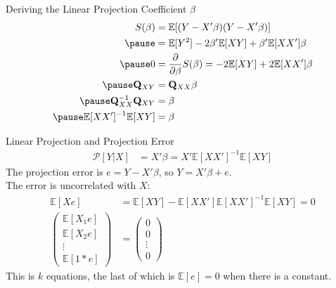 \documentclass[aspectratio=169, handout, t]{beamer}
\numberwithin{equation}{section}
\begin{document}
\begin{frame}{Deriving the Linear Projection Coefficient $\beta$}
\begin{align*}
S(\beta)&=\mathbb{E}[(Y-X'\beta)(Y-X'\beta)]\\\pause
&=\mathbb{E}[Y^2]-2\beta'\mathbb{E}[XY]+\beta'\mathbb{E}[XX']\beta\\\pause
0&=\frac{\partial}{\partial \beta} S(\beta)=-2\mathbb{E}[XY]+2\mathbb{E}[XX']\beta\\\pause
\mathbf{Q}_{XY}&=\mathbf{Q}_{XX}\beta\\\pause
\mathbf{Q}_{XX}^{-1}\mathbf{Q}_{XY}&=\beta\\\pause
\mathbb{E}[XX']^{-1}\mathbb{E}[XY]&=\beta
\end{align*}
\end{frame}

\begin{frame}{Linear Projection and Projection Error}
\begin{align*}
\mathcal{P}[Y|X]&=X'\beta=X'\mathbb{E}[XX']^{-1}\mathbb{E}[XY]
\end{align*}\pause
The projection error is $e=Y-X'\beta$, so $Y=X'\beta+e$.\\
\medskip
The error is uncorrelated with $X$:
\begin{align*}
\mathbb{E}[Xe]&=\mathbb{E}[XY]-\mathbb{E}[XX']\mathbb{E}[XX']^{-1}\mathbb{E}[XY]=0\\
\begin{pmatrix}\mathbb{E}[X_1e]\\\mathbb{E}[X_2e] \\ \vdots \\\mathbb{E}[1*e] \end{pmatrix}&=\begin{pmatrix}0\\0\\ \vdots \\ 0\end{pmatrix}
\end{align*}
This is $k$ equations, the last of which is $\mathbb{E}[e]=0$ when there is a constant.
\end{frame}
\end{document}
